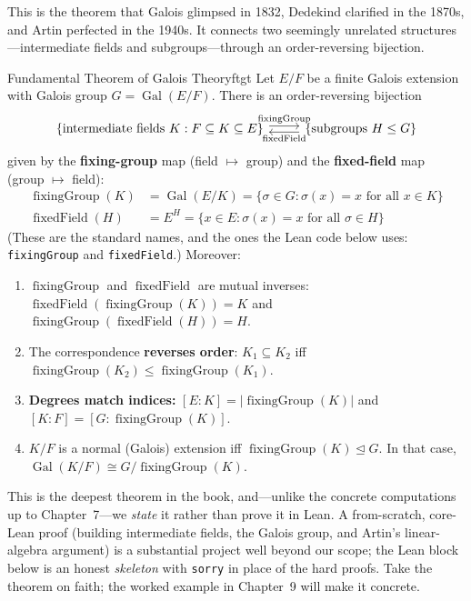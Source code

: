 \documentclass[11pt, a4paper, oneside]{book}
\newcommand{\Gal}{\operatorname{Gal}}
\newcommand{\fixgrp}{\operatorname{fixingGroup}}
\newcommand{\fixfld}{\operatorname{fixedField}}
\newcommand{\normal}{\trianglelefteq}
\newcommand{\iso}{\cong}
\newcommand{\lc}[1]{\texttt{#1}}
\begin{document}
This is the theorem that Galois glimpsed in 1832, Dedekind clarified in the
1870s, and Artin perfected in the 1940s. It connects two seemingly unrelated
structures---intermediate fields and subgroups---through an order-reversing
bijection.

\begin{thm}{Fundamental Theorem of Galois Theory}{ftgt}
Let $E/F$ be a finite Galois extension with Galois group
$G = \Gal(E/F)$. There is an order-reversing bijection
\[
\begin{tikzcd}[row sep=0.5cm]
  \{\text{intermediate fields } K : F \subseteq K \subseteq E\}
  \arrow[r, shift left, "\fixgrp"]
  &
  \{\text{subgroups } H \leq G\}
  \arrow[l, shift left, "\fixfld"]
\end{tikzcd}
\]
given by the \textbf{fixing-group} map (field $\mapsto$ group) and the
\textbf{fixed-field} map (group $\mapsto$ field):
\begin{align*}
  \fixgrp(K) &= \Gal(E/K) = \{\sigma \in G : \sigma(x) = x \text{ for all } x \in K\} \\
  \fixfld(H) &= E^H = \{x \in E : \sigma(x) = x \text{ for all } \sigma \in H\}
\end{align*}
(These are the standard names, and the ones the Lean code below uses:
\lc{fixingGroup} and \lc{fixedField}.) Moreover:
\begin{enumerate}[nosep, label=(\roman*)]
\item $\fixgrp$ and $\fixfld$ are mutual inverses: $\fixfld(\fixgrp(K)) = K$ and
  $\fixgrp(\fixfld(H)) = H$.
\item The correspondence \textbf{reverses order}: $K_1 \subseteq K_2$
  iff $\fixgrp(K_2) \leq \fixgrp(K_1)$.
\item \textbf{Degrees match indices:} $[E:K] = |\fixgrp(K)|$ and
  $[K:F] = [G : \fixgrp(K)]$.
\item $K/F$ is a normal (Galois) extension iff $\fixgrp(K) \normal G$.
  In that case, $\Gal(K/F) \iso G / \fixgrp(K)$.
\end{enumerate}
\end{thm}

\begin{warning}
This is the deepest theorem in the book, and---unlike the concrete
computations up to Chapter~7---we \emph{state} it rather than prove it in Lean. A from-scratch,
core-Lean proof (building intermediate fields, the Galois group, and Artin's
linear-algebra argument) is a substantial project well beyond our scope; the
Lean block below is an honest \emph{skeleton} with \lc{sorry} in place of the
hard proofs. Take the theorem on faith; the worked example in Chapter~9 will
make it concrete.
\end{warning}
\end{document}
